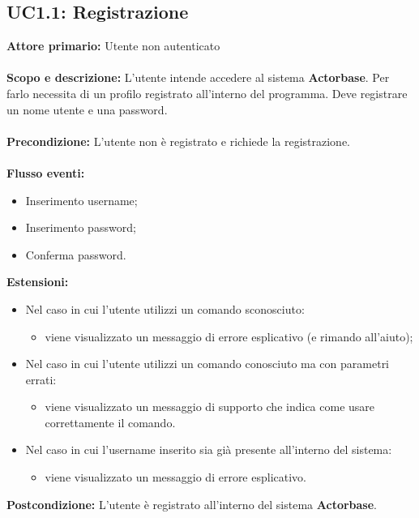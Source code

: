 \documentclass{scalatekids-article}
\begin{document}
\subsection{UC1.1: Registrazione}
\textbf{Attore primario:} Utente non autenticato\\ \\
\textbf{Scopo e descrizione:} L'utente intende accedere al sistema \textbf{Actorbase}. Per farlo necessita di un
profilo registrato all'interno del programma. Deve registrare un nome utente e una password.\\ \\
\textbf{Precondizione:} L'utente non è registrato e richiede la registrazione.\\ \\
\textbf{Flusso eventi:}
\begin{itemize}
\item Inserimento username;
\item Inserimento password;
\item Conferma password.
\end{itemize}
\textbf{Estensioni:}
\begin{itemize}
\item Nel caso in cui l'utente utilizzi un comando sconosciuto:
  \begin{itemize}
  \item viene visualizzato un messaggio di errore esplicativo (e rimando all'aiuto);
  \end{itemize}
\item Nel caso in cui l'utente utilizzi un comando conosciuto ma con parametri errati:
  \begin{itemize}
  \item viene visualizzato un messaggio di supporto che indica come usare correttamente il comando.
  \end{itemize}
\item Nel caso in cui l'username inserito sia già presente all'interno del sistema:
  \begin{itemize}
  \item viene visualizzato un messaggio di errore esplicativo.
  \end{itemize}
\end{itemize}
\textbf{Postcondizione:} L'utente è registrato all'interno del sistema \textbf{Actorbase}.
\end{document}
